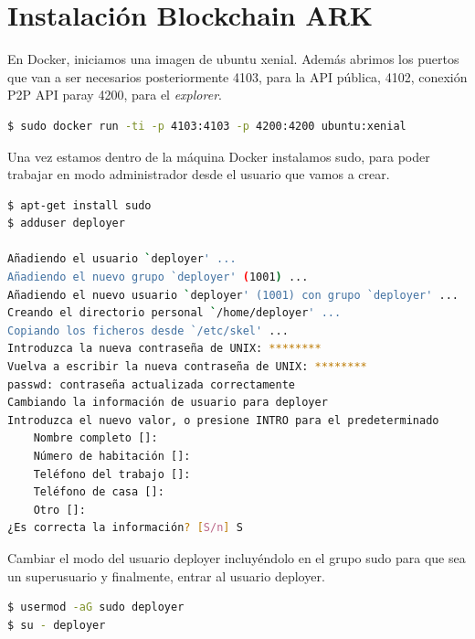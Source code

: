 \section{Instalación Blockchain ARK}

En Docker, iniciamos una imagen de ubuntu xenial. Además abrimos los puertos que van a ser necesarios posteriormente 4103, para la API pública, 4102, conexión P2P API paray 4200, para el \textit{explorer}.\\

\begin{lstlisting}[language=Bash,caption=Instalación \textit{blockchain}. Parte I, label=cod:suma-cuerpo, style=Consola]
$ sudo docker run -ti -p 4103:4103 -p 4200:4200 ubuntu:xenial
\end{lstlisting}

Una vez estamos dentro de la máquina Docker instalamos sudo, para poder trabajar en modo administrador desde el usuario que vamos a crear.\\

\begin{lstlisting}[language=Bash,caption=Instalación \textit{blockchain}. Parte II, label=cod:suma-cuerpo, style=Consola]
$ apt-get install sudo
$ adduser deployer

Añadiendo el usuario `deployer' ...
Añadiendo el nuevo grupo `deployer' (1001) ...
Añadiendo el nuevo usuario `deployer' (1001) con grupo `deployer' ...
Creando el directorio personal `/home/deployer' ...
Copiando los ficheros desde `/etc/skel' ...
Introduzca la nueva contraseña de UNIX: ********
Vuelva a escribir la nueva contraseña de UNIX: ********
passwd: contraseña actualizada correctamente
Cambiando la información de usuario para deployer
Introduzca el nuevo valor, o presione INTRO para el predeterminado
	Nombre completo []: 
	Número de habitación []: 
	Teléfono del trabajo []: 
	Teléfono de casa []: 
	Otro []: 
¿Es correcta la información? [S/n] S
\end{lstlisting}

Cambiar el modo del usuario deployer incluyéndolo en el grupo sudo para que sea un superusuario y finalmente, entrar al usuario deployer.\\

\begin{lstlisting}[language=Bash,caption=Instalación \textit{blockchain}. Parte III, label=cod:suma-cuerpo, style=Consola]
$ usermod -aG sudo deployer
$ su - deployer
\end{lstlisting}

